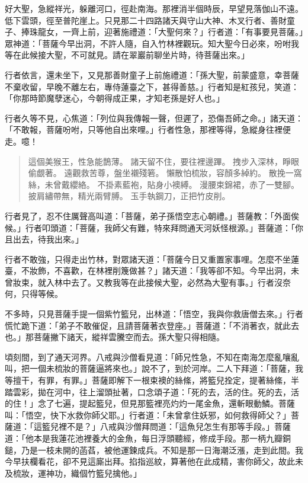 好大聖，急縱祥光，躲離河口，徑赴南海。那裡消半個時辰，早望見落伽山不遠。低下雲頭，徑至普陀崖上。只見那二十四路諸天與守山大神、木叉行者、善財童子、捧珠龍女，一齊上前，迎著施禮道：「大聖何來？」行者道：「有事要見菩薩。」眾神道：「菩薩今早出洞，不許人隨，自入竹林裡觀玩。知大聖今日必來，吩咐我等在此候接大聖，不可就見。請在翠巖前聊坐片時，待菩薩出來。」

行者依言，還未坐下，又見那善財童子上前施禮道：「孫大聖，前蒙盛意，幸菩薩不棄收留，早晚不離左右，專侍蓮臺之下，甚得善慈。」行者知是紅孩兒，笑道：「你那時節魔孽迷心，今朝得成正果，才知老孫是好人也。」

行者久等不見，心焦道：「列位與我傳報一聲，但遲了，恐傷吾師之命。」諸天道：「不敢報，菩薩吩咐，只等他自出來哩。」行者性急，那裡等得，急縱身往裡便走。噫！
\begin{quote}
這個美猴王，性急能鵲薄。
諸天留不住，要往裡邊蹕。
拽步入深林，睜眼偷覷著。
遠觀救苦尊，盤坐襯殘箬。
懶散怕梳妝，容顏多綽約。
散挽一窩絲，未曾戴纓絡。
不掛素藍袍，貼身小襖縛。
漫腰束錦裙，赤了一雙腳。
披肩繡帶無，精光兩臂膊。
玉手執鋼刀，正把竹皮削。
\end{quote}
行者見了，忍不住厲聲高叫道：「菩薩，弟子孫悟空志心朝禮。」菩薩教：「外面俟候。」行者叩頭道：「菩薩，我師父有難，特來拜問通天河妖怪根源。」菩薩道：「你且出去，待我出來。」

行者不敢強，只得走出竹林，對眾諸天道：「菩薩今日又重置家事哩。怎麼不坐蓮臺，不妝飾，不喜歡，在林裡削篾做甚？」諸天道：「我等卻不知。今早出洞，未曾妝束，就入林中去了。又教我等在此接候大聖，必然為大聖有事。」行者沒奈何，只得等候。

不多時，只見菩薩手提一個紫竹籃兒，出林道：「悟空，我與你救唐僧去來。」行者慌忙跪下道：「弟子不敢催促，且請菩薩著衣登座。」菩薩道：「不消著衣，就此去也。」那菩薩撇下諸天，縱祥雲騰空而去。孫大聖只得相隨。

頃刻間，到了通天河界。八戒與沙僧看見道：「師兄性急，不知在南海怎麼亂嚷亂叫，把一個未梳妝的菩薩逼將來也。」說不了，到於河岸。二人下拜道：「菩薩，我等擅干，有罪，有罪。」菩薩即解下一根束襖的絲絛，將籃兒拴定，提著絲絛，半踏雲彩，拋在河中，往上溜頭扯著，口念頌子道：「死的去，活的住。死的去，活的住！」念了七遍，提起籃兒，但見那籃裡亮灼灼一尾金魚，還斬眼動鱗。菩薩叫：「悟空，快下水救你師父耶。」行者道：「未曾拿住妖邪，如何救得師父？」菩薩道：「這籃兒裡不是？」八戒與沙僧拜問道：「這魚兒怎生有那等手段。」菩薩道：「他本是我蓮花池裡養大的金魚，每日浮頭聽經，修成手段。那一柄九瓣銅鎚，乃是一枝未開的菡萏，被他運鍊成兵。不知是那一日海潮泛漲，走到此間。我今早扶欄看花，卻不見這廝出拜。掐指巡紋，算著他在此成精，害你師父，故此未及梳妝，運神功，織個竹籃兒擒他。」

